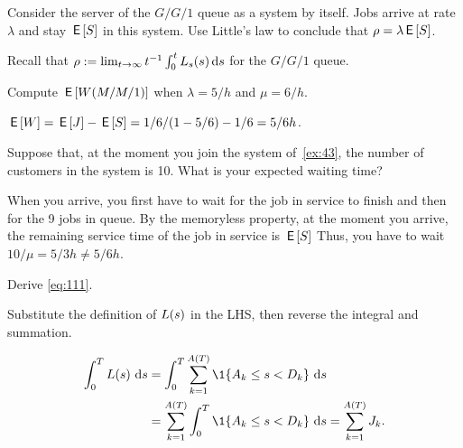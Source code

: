 \begin{exercise}\label{ex:37}
 Consider the server of the $G/G/1$ queue as a system by itself.
Jobs arrive at rate $\lambda$ and stay $\,\mathsf{E}\left[S\right]$ in this system.
Use  Little's law to conclude that  $\rho = \lambda  \,\mathsf{E}\left[S\right]$.
\begin{solution}
Recall that  $\rho := \lim_{t\to\infty} t^{-1}\int_0^t L_s(s)\,\textrm{d}s$ for the $G/G/1$ queue. 
\end{solution}
\end{exercise}


\begin{exercise}\label{ex:43}
Compute $\,\mathsf{E}\left[W(M/M/1)\right]$  when $\lambda=5/h$ and $\mu=6/h$.
\begin{solution}
$\,\mathsf{E}\left[W\right] = \,\mathsf{E}\left[J\right] - \,\mathsf{E}\left[S\right] = 1/6/(1-5/6) - 1/6 = 5/6h$.
\end{solution}
\end{exercise}

\begin{exercise}\label{ex:44}
 Suppose that, at the moment you join the system of~\cref{ex:43}, the number of customers in the system is 10.
What is your  expected waiting time?
\begin{solution}
  When you arrive, you first have to wait for the job in service to finish and then for the 9 jobs in queue.
  By the memoryless property, at the moment you arrive, the remaining service time of the job in service is $\,\mathsf{E}\left[S\right]$ Thus, you have to wait $10/\mu = 5/3 h \neq 5/6 h$.
\end{solution}
\end{exercise}



\begin{exercise}\label{ex:59}
Derive \cref{eq:111}.
\begin{hint}
 Substitute the definition of $L(s)$ in the LHS, then reverse the integral and summation.
\end{hint}
\begin{solution}
\begin{equation*}
 \begin{split}
 \int_0^T \L(s)\, \d s & = \int_0^T \sum_{k=1}^{A(T)} \1{A_k \leq s < D_k}\, \d s \\
& = \sum_{k=1}^{A(T)}\int_0^T \1{A_k \leq s < D_k}\, \d s = \sum_{k=1}^{A(T)} \J_k.
 \end{split}
\end{equation*}
\end{solution}
\end{exercise}


